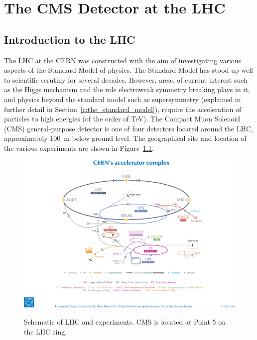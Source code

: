 \chapter{The CMS Detector at the LHC}
\label{c:CMS_Detector}

\section{Introduction to the LHC}
\label{s:Introduction}
The LHC at the CERN was constructed with the aim of investigating various aspects of the Standard Model of
physics. The Standard Model has stood up well to scientific scrutiny for several decades.
However, areas of current interest such as the Higgs mechanism and the role electroweak symmetry breaking
plays in it, and physics beyond the standard model such as supersymmetry (explained in further detail in
Section~\ref{c:the_standard_model}), require the acceleration of particles to high energies
(of the order of TeV). The Compact Muon Solenoid (CMS) general-purpose detector is one of four detectors
located around the LHC, approximately 100~m below ground level. The geographical site and location of the
various experiments are shown in Figure~\ref{fig:LHC_schematic}.

\begin{figure}[hbtp]
   \centering
     \includegraphics[width=\textwidth]{Chapters/02_Detector/Images/0812015.jpg}\\
     \caption[Schematic of LHC and experiments.]{Schematic of LHC and experiments. CMS is located at Point
     5 on the LHC ring.}
     \label{fig:LHC_schematic}
\end{figure}



